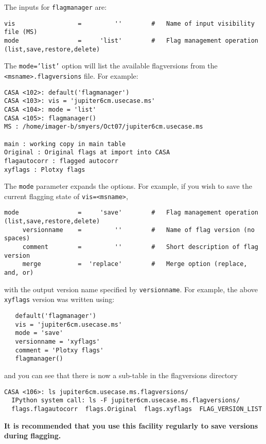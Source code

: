 The inputs for {\tt flagmanager} are:
\small
\begin{verbatim}
vis                 =         ''        #   Name of input visibility file (MS)
mode                =     'list'        #   Flag management operation (list,save,restore,delete)
\end{verbatim}
\normalsize

The {\tt mode='list'} option will list the available flagversions from
the {\tt <msname>.flagversions} file.  For example:
\small
\begin{verbatim}
CASA <102>: default('flagmanager')
CASA <103>: vis = 'jupiter6cm.usecase.ms'
CASA <104>: mode = 'list'
CASA <105>: flagmanager()
MS : /home/imager-b/smyers/Oct07/jupiter6cm.usecase.ms

main : working copy in main table
Original : Original flags at import into CASA
flagautocorr : flagged autocorr
xyflags : Plotxy flags
\end{verbatim}
\normalsize

The {\tt mode} parameter expands the options.  For example, if you wish to 
save the current flagging state of {\tt vis=<msname>}, 
\small
\begin{verbatim}
mode                =     'save'        #   Flag management operation (list,save,restore,delete)
     versionname    =         ''        #   Name of flag version (no spaces)
     comment        =         ''        #   Short description of flag version
     merge          =  'replace'        #   Merge option (replace, and, or)
\end{verbatim}
\normalsize
with the output version name specified by {\tt versionname}.  For example, the
above {\tt xyflags} version was written using:
\small
\begin{verbatim}
   default('flagmanager')
   vis = 'jupiter6cm.usecase.ms'
   mode = 'save'
   versionname = 'xyflags'
   comment = 'Plotxy flags'
   flagmanager()
\end{verbatim}
\normalsize
and you can see that there is now a sub-table in the flagversions directory
\small
\begin{verbatim}
CASA <106>: ls jupiter6cm.usecase.ms.flagversions/
  IPython system call: ls -F jupiter6cm.usecase.ms.flagversions/
  flags.flagautocorr  flags.Original  flags.xyflags  FLAG_VERSION_LIST
\end{verbatim}

\normalsize
{\bf It is recommended that you use this facility regularly to save versions
during flagging.}

